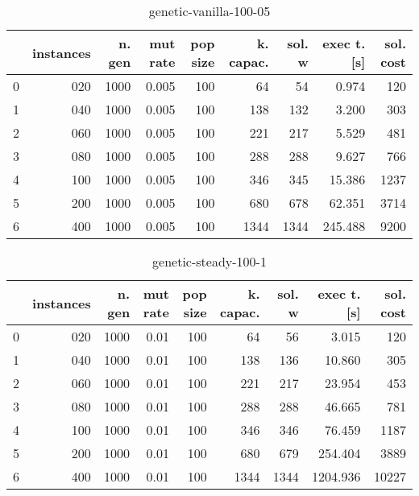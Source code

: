 \begin{table}[H]
    \centering
    \begin{tabular}{lrrrrrrrr}
        \toprule
        {} & instances & n. gen & mut rate & pop size & k. capac. & sol. w & exec t. [s] & sol. cost \\
        \midrule
        0  & 020        & 1000   & 0.005    & 100      & 64        & 54     & 0.974       & 120      \\
        1  & 040        & 1000   & 0.005    & 100      & 138       & 132    & 3.200       & 303      \\
        2  & 060        & 1000   & 0.005    & 100      & 221       & 217    & 5.529       & 481      \\
        3  & 080        & 1000   & 0.005    & 100      & 288       & 288    & 9.627       & 766      \\
        4  & 100        & 1000   & 0.005    & 100      & 346       & 345    & 15.386      & 1237      \\
        5  & 200        & 1000   & 0.005    & 100      & 680       & 678    & 62.351      & 3714      \\
        6  & 400        & 1000   & 0.005    & 100      & 1344      & 1344   & 245.488     & 9200      \\
        \bottomrule
    \end{tabular}
    \caption{genetic-vanilla-100-05}
    \label{table:genetic-vanilla-100-05}
\end{table}

\begin{table}[H]
    \centering
    \begin{tabular}{lrrrrrrrr}
        \toprule
        {} & instances & n. gen & mut rate & pop size & k. capac. & sol. w & exec t. [s] & sol. cost \\
        \midrule
        0  & 020        & 1000   & 0.01     & 100      & 64        & 56     & 3.015       & 120      \\
        1  & 040        & 1000   & 0.01     & 100      & 138       & 136    & 10.860      & 305      \\
        2  & 060        & 1000   & 0.01     & 100      & 221       & 217    & 23.954      & 453      \\
        3  & 080        & 1000   & 0.01     & 100      & 288       & 288    & 46.665      & 781      \\
        4  & 100        & 1000   & 0.01     & 100      & 346       & 346    & 76.459      & 1187      \\
        5  & 200        & 1000   & 0.01     & 100      & 680       & 679    & 254.404     & 3889      \\
        6  & 400        & 1000   & 0.01     & 100      & 1344      & 1344   & 1204.936    & 10227     \\
        \bottomrule
    \end{tabular}
    \caption{genetic-steady-100-1}
    \label{table:genetic-steady-100-1}
\end{table}
